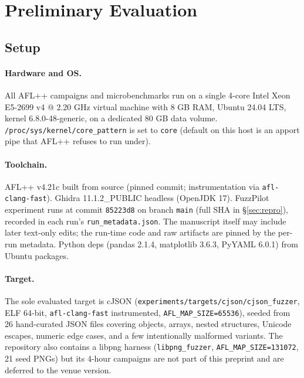 \documentclass[11pt]{article}
\begin{document}
\section{Preliminary Evaluation}
\label{sec:eval}
\subsection{Setup}
\label{sec:eval:setup}

\paragraph{Hardware and OS.}
All AFL++ campaigns and microbenchmarks run on a single 4-core Intel
Xeon E5-2699 v4 @ 2.20 GHz virtual machine with 8 GB RAM,
Ubuntu 24.04 LTS, kernel 6.8.0-48-generic, on a dedicated 80 GB data
volume. \texttt{/proc/sys/kernel/core\_pattern} is set to \texttt{core}
(default on this host is an apport pipe that AFL++ refuses to run
under).

\paragraph{Toolchain.}
AFL++ v4.21c built from source (pinned commit; instrumentation via
\texttt{afl-\allowbreak clang-\allowbreak fast}). Ghidra 11.1.2\_PUBLIC headless (OpenJDK 17).
FuzzPilot experiment runs at commit \texttt{85223d8} on branch
\texttt{main} (full SHA in \S\ref{sec:repro}), recorded in each
run's \texttt{run\_metadata.json}.
The manuscript itself may include later text-only edits; the
run-time code and raw artifacts are pinned by the per-run metadata.
Python deps (pandas 2.1.4, matplotlib 3.6.3, PyYAML 6.0.1) from
Ubuntu packages.

\paragraph{Target.}
The sole evaluated target is cJSON
(\texttt{experiments/targets/cjson/cjson\_fuzzer}, ELF 64-bit,
\texttt{afl-clang-fast} instrumented, \texttt{AFL\_MAP\_SIZE=65536}),
seeded from 26 hand-curated JSON files covering objects, arrays,
nested structures, Unicode escapes, numeric edge cases, and a few
intentionally malformed variants. The repository also contains a
libpng harness (\texttt{libpng\_fuzzer},
\texttt{AFL\_MAP\_SIZE=131072}, 21 seed PNGs) but its 4-hour
campaigns are not part of this preprint and are deferred to the
venue version.
\end{document}
